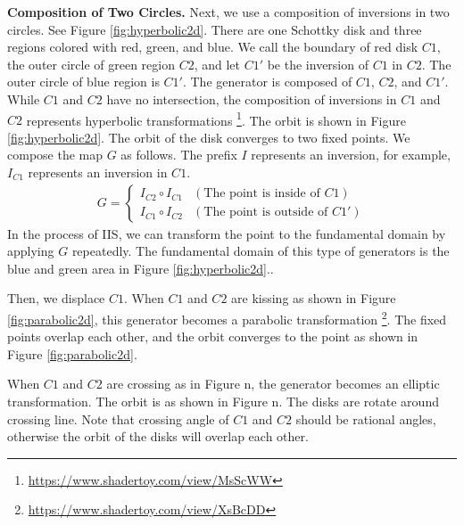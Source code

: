 \noindent\textbf{Composition of Two Circles.}
 Next, we use a composition of inversions in two circles.
 See Figure \ref{fig:hyperbolic2d}.
 There are one Schottky disk and three regions colored with red, green,
 and blue.
 We call the boundary of red disk $C1$, 
 the outer circle of green region $C2$, and
 let $C1'$ be the inversion of $C1$ in $C2$.
 The outer circle of blue region is $C1'$.
 The generator is composed of $C1$, $C2$, and $C1'$.
 While $C1$ and $C2$ have no intersection, the composition of inversions
 in $C1$ and $C2$ represents hyperbolic transformations
 \footnote{\url{https://www.shadertoy.com/view/MsScWW}}.
 The orbit is shown in Figure
 \ref{fig:hyperbolic2d}.
 The orbit of the disk converges to two fixed points.
 We compose the map $G$ as follows.
 The prefix $I$ represents an inversion, for example, $I_{C1}$ represents
 an inversion in $C1$.
 \begin{align*}
  G =
  \begin{cases}
   I_{C2} \circ I_{C1} & (\text{The point is inside of } C1) \\
   I_{C1} \circ I_{C2} & (\text{The point is outside of }C1')
  \end{cases}
 \end{align*}
 In the process of IIS, we can transform the point to the fundamental
 domain by applying $G$ repeatedly.
 The fundamental domain of this type of generators is the blue and green
 area in Figure \ref{fig:hyperbolic2d}..

 Then, we displace $C1$.
 When $C1$ and $C2$ are kissing as shown in Figure 
 \ref{fig:parabolic2d},
 this generator becomes a parabolic transformation
 \footnote{\url{https://www.shadertoy.com/view/XsBcDD}}.
 The fixed points overlap each other, and the orbit converges to the
 point as shown in Figure \ref{fig:parabolic2d}.

 When $C1$ and $C2$ are crossing as in Figure n, 
 the generator becomes an elliptic transformation.
 The orbit is as shown in Figure n.
 The disks are rotate around crossing line.
 Note that crossing angle of $C1$ and $C2$ should be rational angles,
 otherwise the orbit of the disks will overlap each other.


